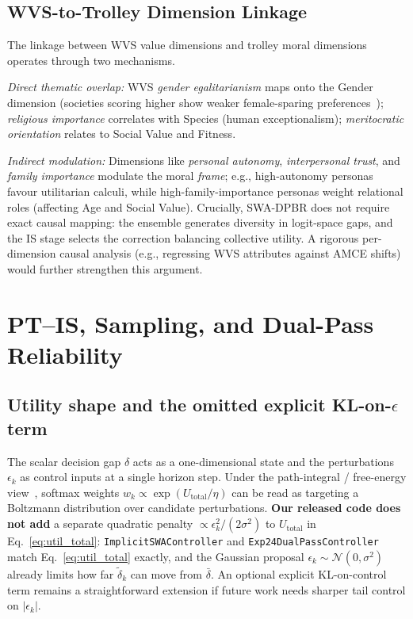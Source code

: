 \documentclass{article}
\begin{document}
\subsection{WVS-to-Trolley Dimension Linkage}
\label{app:wvs_linkage}

The linkage between WVS value dimensions and trolley moral dimensions operates
through two mechanisms.

\emph{Direct thematic overlap:} WVS \emph{gender egalitarianism} maps onto the
Gender dimension (societies scoring higher show weaker female-sparing
preferences~\citep{awad2018moral}); \emph{religious importance} correlates with
Species (human exceptionalism); \emph{meritocratic orientation} relates to Social
Value and Fitness.

\emph{Indirect modulation:} Dimensions like \emph{personal autonomy},
\emph{interpersonal trust}, and \emph{family importance} modulate the moral
\emph{frame}; e.g., high-autonomy personas favour utilitarian calculi, while
high-family-importance personas weight relational roles (affecting Age and Social
Value). Crucially, SWA-DPBR does not require exact causal mapping: the ensemble
generates diversity in logit-space gaps, and the IS stage selects the correction balancing
collective utility. A rigorous per-dimension causal analysis (e.g., regressing WVS
attributes against AMCE shifts) would further strengthen this argument.

\section{PT--IS, Sampling, and Dual-Pass Reliability}
\label{app:dpbr_theory}

\subsection{Utility shape and the omitted explicit KL-on-$\epsilon$ term}

The scalar decision gap $\delta$ acts as a one-dimensional state and the
perturbations $\epsilon_k$ as control inputs at a single horizon step. Under
the path-integral / free-energy view~\citep{williams2017mppi}, softmax
weights $w_k \propto \exp(U_{\text{total}}/\eta)$ can be read as targeting a
Boltzmann distribution over candidate perturbations. \textbf{Our released code
does not add} a separate quadratic penalty
$\propto \epsilon_k^2/(2\sigma^2)$ to $U_{\text{total}}$ in
Eq.~\ref{eq:util_total}: \texttt{ImplicitSWAController} and
\texttt{Exp24DualPassController} match Eq.~\ref{eq:util_total} exactly, and
the Gaussian proposal $\epsilon_k\sim\mathcal{N}(0,\sigma^2)$ already limits
how far $\tilde{\delta}_k$ can move from $\bar{\delta}$. An optional explicit
KL-on-control term remains a straightforward extension if future work needs
sharper tail control on $|\epsilon_k|$.
\end{document}
